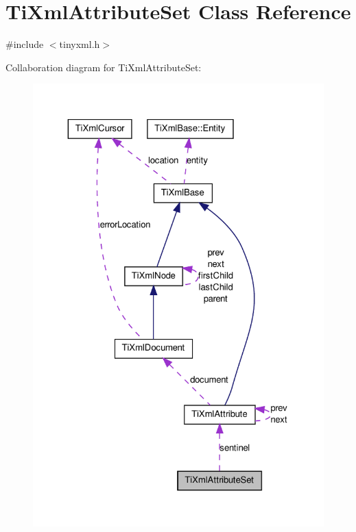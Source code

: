 \hypertarget{classTiXmlAttributeSet}{
\section{TiXmlAttributeSet Class Reference}
\label{df/dda/classTiXmlAttributeSet}
}


{\ttfamily \#include $<$tinyxml.h$>$}



Collaboration diagram for TiXmlAttributeSet:
\nopagebreak
\begin{figure}[H]
\begin{center}
\leavevmode
\includegraphics[width=325pt]{d4/dde/classTiXmlAttributeSet__coll__graph}
\end{center}
\end{figure}

